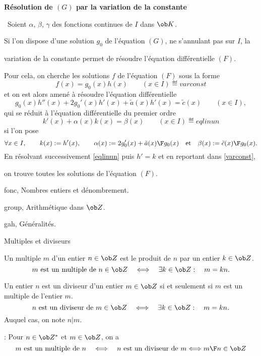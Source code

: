 \centerline{\bf R\'esolution de $(G)$ par la variation de la constante}
\medskip
\noindent\ Soient $\alpha$, $\beta$, $\gamma$ des fonctions continues de $I$ dans $\ob K$. 

\noindent
Si l'on dispose d'une solution $g_0$ de l'\'equation $(G)$, ne s'annulant pas sur $I$, 
la 

\noindent variation de la constante permet de r\'esoudre l'\'equation diff\'erentielle $(F)$. 

\noindent
Pour cela, on cherche les solutions $f$ de l'\'equation $(F)$ sous la forme 
$$
f(x)=g_0(x)h(x)\qquad (x\in I)\eqdef{varconst}
$$
et on est alors amen\'e \`a r\'esoudre l'\'equation diff\'erentielle 
$$
g_0(x)h''(x)+2g_0'(x)h'(x)+\tilde a(x)h'(x)=\tilde c(x)\qquad (x\in I),
$$
qui se r\'eduit \`a l'\'equation diff\'erentielle du premier ordre
$$
k'(x)+\alpha(x)k(x)=\beta(x)\qquad (x\in I)\eqdef{eqlinun}
$$
si l'on pose 
$$
\forall x\in I, \qquad k(x):=h'(x), \qquad\alpha(x):={2g_0'(x)+\tilde a(x)\F g_0(x)}\quad \mbox{et}\quad\beta(x):={\tilde c(x)\F g_0(x)}.
$$
\quad En r\'esolvant successivement \eqref{eqlinun} puis $h'=k$ et en reportant dans \eqref{varconst}, 

\qquad on trouve toutes les solutions de l'\'equation $(F)$. 







                     



\Chapter fonc, Nombres entiers et d\'enombrement. 
\bigskip

\Section group, Arithm\'etique dans $\ob Z$. 

\Subsection gah, G\'en\'eralit\'es.

\Concept [] Multiples et diviseurs

\Definition []  Un multiple $m$ d'un entier $n\in\ob Z$ est le produit de $n$ par un entier $k\in\ob Z$.
$$
m\mbox{ est un multiple de }n\in\ob Z\quad \Longleftrightarrow\quad \exists k\in\ob Z:\quad m=kn.
$$ 

\Definition []  Un entier $n$ est un diviseur d'un entier $m\in\ob Z$ si et seulement si $m$ est un multiple de l'entier $m$. 
$$
n\mbox{ est un diviseur de }m\in\ob Z\quad \Longleftrightarrow\quad \exists k\in\ob Z:\quad m=kn.
$$ 
Auquel cas, on note $n|m$. 
\bigskip

\Remarque : Pour $n\in\ob Z^*$ et $m\in\ob Z$, on a 
$$
m\mbox{ est un multiple de }n\quad \Longleftrightarrow\quad n\mbox{ est un diviseur de }m \Longleftrightarrow {m\F n}\in\ob Z
$$
\bigskip

